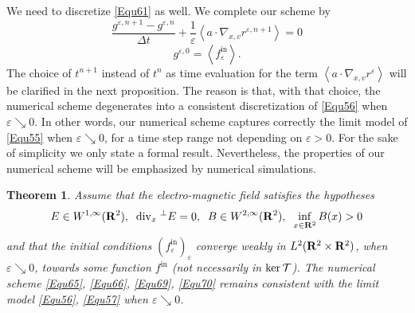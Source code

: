 \documentclass[12pt, a4paper]{article}
\newcommand{\red}{\textcolor{red!95!black}}
\providecommand\mathbb{\bf}
\newcommand\R{{\mathbb R}}
\newtheorem{thm}{Theorem}[section]
\newcommand{\eps}[0]{
\varepsilon}
\newcommand{\re}[0]{
r ^\varepsilon}
\newcommand{\renpo}[0]{
r ^{\varepsilon, n + 1}}
\newcommand{\gez}[0]{
g ^{\varepsilon, 0}}
\newcommand{\gen}[0]{
g ^{\varepsilon, n}}
\newcommand{\genpo}[0]{
g ^{\varepsilon, n + 1}}
\newcommand{\fin}[0]{
f ^{\mathrm{in}}}
\newcommand{\fine}[0]{
f ^{\mathrm{in}}_{\varepsilon}}
\newcommand{\Divx}[0]{
\mathrm{div}_x}
\newcommand{\ltxv}[0]{
L^2(\R ^2 \times \R ^2)}
\newcommand{\nxv}[0]{
\nabla_{x,v}}
\newcommand{\ave}[1]{
\left \langle #1 \right \rangle }
\begin{document}
We need to discretize \eqref{Equ61} as well. We complete our scheme by
\begin{equation}
\label{Equ69} \frac{\genpo - \gen }{\Delta t} + \frac{1}{\eps} \ave{ a \cdot \nxv \renpo } = 0
\end{equation}
\begin{equation}
\label{Equ70}  \gez = \ave{\fine }.
\end{equation}
The choice of $t^{n+1}$ instead of $t^n$ as time evaluation for the term $\ave{a \cdot \nxv \re}$ will be clarified in the next proposition. The reason is that, with that choice, the numerical scheme degenerates into a consistent discretization of \eqref{Equ56} when $\eps \searrow 0$. In other words, our numerical scheme captures correctly the limit model of \eqref{Equ55} when $\eps \searrow 0$, for a time step range not depending on $\eps >0$. For the sake of simplicity we only state a formal result. Nevertheless, the properties of our numerical scheme will be emphasized by numerical simulations. 
\begin{thm}
\label{Consistency} Assume that the electro-magnetic field satisfies the hypotheses
\[
E \in W^{1,\infty} (\R^2),\;\;\Divx \;^\perp E = 0,\;\;B \in W^{2,\infty} (\R^2),\;\; \inf _{x \in \R^2} B(x) >0
\]
and that \red{the initial conditions $(\fine)_\eps$ converge weakly in $\ltxv{}$, when $\eps \searrow 0$, towards some function $\fin$ (not necessarily in $ \ker {\cal T}$)}. The numerical scheme \eqref{Equ65}, \eqref{Equ66}, \eqref{Equ69}, \eqref{Equ70} remains consistent with the limit model \eqref{Equ56}, \eqref{Equ57} when $\eps \searrow 0$.  
\end{thm}
\end{document}
